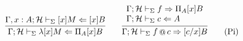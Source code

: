 \documentclass{amsart}
\begin{document}

\begin{equation}
  \infer{
    \Gamma;\mathcal{H}\vdash_\Sigma\lambda [x]M\checks\Pi_A[x]B
  }{
    \Gamma,x:A;\mathcal{H}\vdash_\Sigma [x]M\checks[x]B
  }
  \qquad
  \infer{
    \Gamma;\mathcal{H}\vdash_\Sigma f\mathop{@}c \infers [c/x]B
  }{
    \begin{array}{l}
      \Gamma;\mathcal{H}\vdash_\Sigma f\infers\Pi_A[x]B\\
      \Gamma;\mathcal{H}\vdash_\Sigma c\checks A
    \end{array}
  }
  \tag{Pi}
\end{equation}
\end{document}
